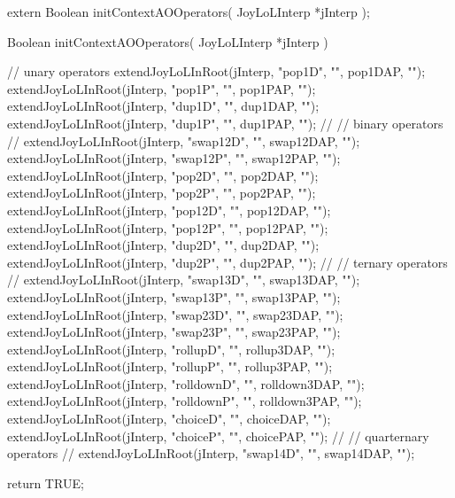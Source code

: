 \startCHeader
extern Boolean initContextAOOperators(
  JoyLoLInterp *jInterp
);
\stopCHeader
{}

\startCCode
Boolean initContextAOOperators(
  JoyLoLInterp *jInterp
) {
  // unary operators
  extendJoyLoLInRoot(jInterp, "pop1D", "", pop1DAP, "");
  extendJoyLoLInRoot(jInterp, "pop1P", "", pop1PAP, "");
  extendJoyLoLInRoot(jInterp, "dup1D", "", dup1DAP, "");
  extendJoyLoLInRoot(jInterp, "dup1P", "", dup1PAP, "");
  //
  // binary operators
  //
  extendJoyLoLInRoot(jInterp, "swap12D", "", swap12DAP, "");
  extendJoyLoLInRoot(jInterp, "swap12P", "", swap12PAP, "");
  extendJoyLoLInRoot(jInterp, "pop2D",   "", pop2DAP,   "");
  extendJoyLoLInRoot(jInterp, "pop2P",   "", pop2PAP,   "");
  extendJoyLoLInRoot(jInterp, "pop12D",  "", pop12DAP,  "");
  extendJoyLoLInRoot(jInterp, "pop12P",  "", pop12PAP,  "");
  extendJoyLoLInRoot(jInterp, "dup2D",   "", dup2DAP,   "");
  extendJoyLoLInRoot(jInterp, "dup2P",   "", dup2PAP,   "");
  //
  // ternary operators
  //
  extendJoyLoLInRoot(jInterp, "swap13D",   "", swap13DAP,   "");
  extendJoyLoLInRoot(jInterp, "swap13P",   "", swap13PAP,   "");
  extendJoyLoLInRoot(jInterp, "swap23D",   "", swap23DAP,   "");
  extendJoyLoLInRoot(jInterp, "swap23P",   "", swap23PAP,   "");
  extendJoyLoLInRoot(jInterp, "rollupD",   "", rollup3DAP,   "");
  extendJoyLoLInRoot(jInterp, "rollupP",   "", rollup3PAP,   "");
  extendJoyLoLInRoot(jInterp, "rolldownD", "", rolldown3DAP, "");
  extendJoyLoLInRoot(jInterp, "rolldownP", "", rolldown3PAP, "");
  extendJoyLoLInRoot(jInterp, "choiceD",   "", choiceDAP,   "");
  extendJoyLoLInRoot(jInterp, "choiceP",   "", choicePAP,   "");
  //
  // quarternary operators
  //
  extendJoyLoLInRoot(jInterp, "swap14D",   "", swap14DAP,   "");

  return TRUE;
}
\stopCCode
